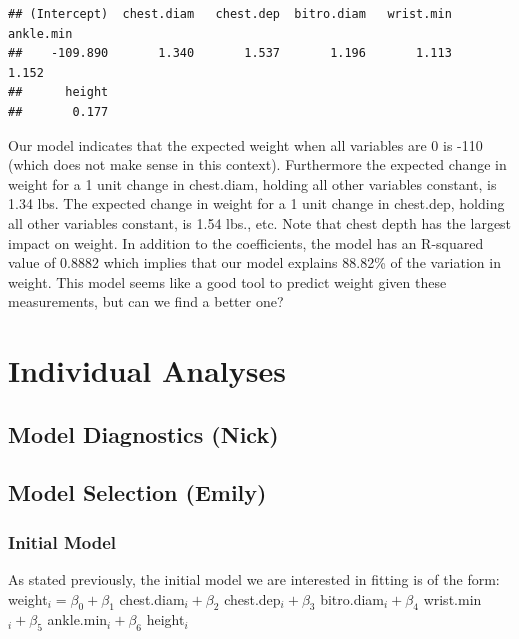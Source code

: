 \documentclass[11pt]{article}\usepackage[]{graphicx}\usepackage[]{color}
\makeatletter
\newenvironment{kframe}{%
 \def\at@end@of@kframe{}%
 \ifinner\ifhmode%
  \def\at@end@of@kframe{\end{minipage}}%
  \begin{minipage}{\columnwidth}%
 \fi\fi%
 \def\FrameCommand##1{\hskip\@totalleftmargin \hskip-\fboxsep
 \colorbox{shadecolor}{##1}\hskip-\fboxsep
     \hskip-\linewidth \hskip-\@totalleftmargin \hskip\columnwidth}%
 \MakeFramed {\advance\hsize-\width
   \@totalleftmargin\z@ \linewidth\hsize
   \@setminipage}}%
 {\par\unskip\endMakeFramed%
 \at@end@of@kframe}
\newenvironment{knitrout}{}{} %
\makeatother
\begin{document}
\begin{knitrout}
\color{fgcolor}\begin{kframe}
\begin{verbatim}
## (Intercept)  chest.diam   chest.dep  bitro.diam   wrist.min   ankle.min 
##    -109.890       1.340       1.537       1.196       1.113       1.152 
##      height 
##       0.177
\end{verbatim}
\end{kframe}
\end{knitrout}


Our model indicates that the expected weight when all variables are 0 is -110 (which does not make sense in this context). Furthermore the expected change in weight for a 1 unit change in chest.diam, holding all other variables constant, is 1.34 lbs. The expected change in weight for a 1 unit change in chest.dep, holding all other variables constant, is 1.54 lbs., etc. Note that chest depth has the largest impact on weight. In addition to the coefficients, the model has an R-squared value of 0.8882 which implies that our model explains 88.82\% of the variation in weight. This model seems like a good tool to predict weight given these measurements, but can we find a better one?

\newpage

\section{Individual Analyses}

\subsection{Model Diagnostics (Nick)} %



\newpage

\subsection{Model Selection (Emily)} %

\subsubsection{Initial Model}

As stated previously, the initial model we are interested in fitting is of the form:\\
weight$_i = \beta_0 + \beta_1$ chest.diam$_{i} + \beta_2$ chest.dep$_{i} + \beta_3$ bitro.diam$_{i} + \beta_4$ wrist.min$_{i} + \beta_5$ ankle.min$_{i} + \beta_6$ height$_{i}$
\end{document}
